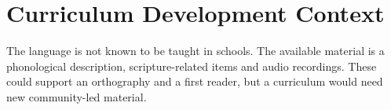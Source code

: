 \documentclass[12pt]{article}
\begin{document}
\section{Curriculum Development Context}
The language is not known to be taught in schools. The available material is a phonological description, scripture-related items and audio recordings. These could support an orthography and a first reader, but a curriculum would need new community-led material.
\end{document}
